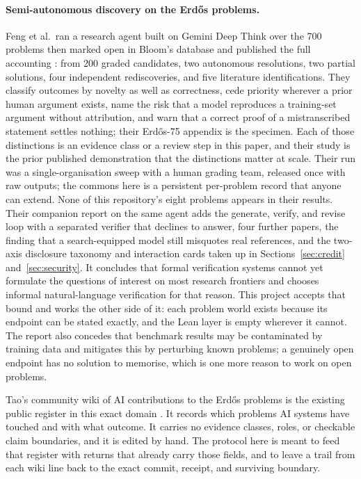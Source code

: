 \documentclass[10pt]{article}
\begin{document}
\paragraph{Semi-autonomous discovery on the Erd\H{o}s problems.}
Feng et al.\ ran a research agent built on Gemini Deep Think over the 700
problems then marked open in Bloom's database and published the full
accounting \cite{aletheia}: from 200 graded candidates, two autonomous
resolutions, two partial solutions, four independent rediscoveries, and five
literature identifications.  They classify outcomes by novelty as well as
correctness, cede priority wherever a prior human argument exists, name the
risk that a model reproduces a training-set argument without attribution, and
warn that a correct proof of a mistranscribed statement settles nothing;
their Erd\H{o}s-75 appendix is the specimen.  Each of those distinctions is
an evidence class or a review step in this paper, and their study is the
prior published demonstration that the distinctions matter at scale.  Their
run was a single-organisation sweep with a human grading team, released once
with raw outputs; the commons here is a persistent per-problem record that
anyone can extend.  None of this repository's eight problems appears in their
results.  Their companion report on the same agent \cite{autonomousmath}
adds the generate, verify, and revise loop with a separated verifier that
declines to answer, four further papers, the finding that a search-equipped
model still misquotes real references, and the two-axis disclosure taxonomy
and interaction cards taken up in Sections~\ref{sec:credit}
and~\ref{sec:security}.  It concludes that formal verification systems
cannot yet formulate the questions of interest on most research frontiers
and chooses informal natural-language verification for that reason.  This
project accepts that bound and works the other side of it: each problem
world exists because its endpoint can be stated exactly, and the Lean layer
is empty wherever it cannot.  The report also concedes that benchmark
results may be contaminated by training data and mitigates this by
perturbing known problems; a genuinely open endpoint has no solution to
memorise, which is one more reason to work on open problems.

Tao's community wiki of AI contributions to the Erd\H{o}s problems is the
existing public register in this exact domain \cite{taowiki}.  It records
which problems AI systems have touched and with what outcome.  It carries no
evidence classes, roles, or checkable claim boundaries, and it is edited by
hand.  The protocol here is meant to feed that register with returns that
already carry those fields, and to leave a trail from each wiki line back to
the exact commit, receipt, and surviving boundary.
\end{document}
